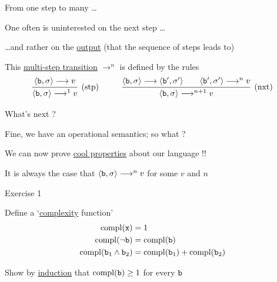 \documentclass{beamer}
\begin{document}
\begin{frame}{From one step to many \dots}
        
        One often is uninterested on the next step \dots

        \dots and rather on the \alert{\underline{output}} (that the sequence of
        steps leads to)

        \pause
        \bigskip
        This \alert{\underline{multi-step transition}}  $\longrightarrow^n$
        is defined by the rules 
        \smallskip
        \[
                \infer[\text{(stp)}]{ 
                        \pv{\prog{b}}{\sigma} \longrightarrow^1 v 
                }{
                        \pv{\prog{b}}{\sigma} \longrightarrow v 
                }
                \hspace{1cm}
                \infer[\text{(nxt)}]{ 
                        \pv{\prog{b}}{\sigma} \longrightarrow^{n+1} v 
                }{
                        \pv{\prog{b}}{\sigma} \longrightarrow 
                        \pv{\prog{b'}}{\sigma'} 
                        \qquad
                        \pv{\prog{b'}}{\sigma'} \longrightarrow^n v
                }
        \]
\end{frame}

\begin{frame}{What's next ?}

        Fine, we have an operational semantics; so what ?

        \pause
        \bigskip
        We can now prove \alert{\underline{cool properties}} about our language
        !!

        \smallskip
        \begin{example}[Termination]
                It is always the case that $\langle \mathtt{b}, \sigma \rangle
                \longrightarrow^n v$ for some $v$ and $n$
        \end{example}
\end{frame}

\begin{frame}{Exercise 1}

        Define a `\alert{\underline{complexity}} function'
        \begin{align*}
                \mathrm{compl}(\mathtt{x}) & = 1  \\
                \mathrm{compl}(\mathtt{\neg b}) & = \mathrm{compl}(\mathtt{b}) \\
                \mathrm{compl}(\mathtt{b}_1 \wedge \mathtt{b}_2) & =
                \mathrm{compl}(\mathtt{b}_1) + \mathrm{compl}(\mathtt{b}_2)
        \end{align*}
        
        \medskip
        Show by \alert{\underline{induction}} that $\mathrm{compl}(\mathtt{b})
        \geq 1$ for every $\mathtt{b}$
\end{frame}
\end{document}
